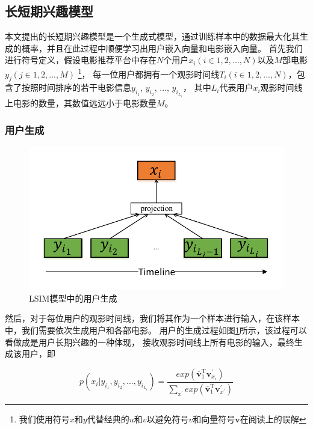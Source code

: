 \subsection{长短期兴趣模型}
本文提出的长短期兴趣模型是一个生成式模型，通过训练样本中的数据最大化其生成的概率，并且在此过程中顺便学习出用户嵌入向量和电影嵌入向量。
首先我们进行符号定义，假设电影推荐平台中存在$N$个用户$x_i(i \in 1,2,...,N)$以及$M$部电影$y_j(j \in 1,2,...,M)$
\footnote{我们使用符号$x$和$y$代替经典的$u$和$v$以避免符号$v$和向量符号$\mathbf{v}$在阅读上的误解}，
每一位用户都拥有一个观影时间线$T_i(i \in 1,2,...,N)$，包含了按照时间排序的若干电影信息$y_{i_1}$, $y_{i_2}$, ..., $y_{i_{L_i}}$，
其中$L_i$代表用户$x_i$观影时间线上电影的数量，其数值远远小于电影数量$M$。

\subsubsection{用户生成}
\begin{figure}[htbp]
    \centering
    \includegraphics[scale=0.6]{images/doc2vec1.pdf}
    \caption{LSIM模型中的用户生成}
    \label{fig:doc2vec1}
\end{figure}

然后，对于每位用户的观影时间线，我们将其作为一个样本进行输入，在该样本中，我们需要依次生成用户和各部电影。
用户的生成过程如图\ref{fig:doc2vec1}所示，该过程可以看做成是用户长期兴趣的一种体现，
接收观影时间线上所有电影的输入，最终生成该用户，即

\begin{equation}
p(x_i | y_{i_1}, y_{i_2}, ..., y_{i_{L_i}}) =
\frac
{
    exp ( \overline{\mathbf{v}}_{1}^{\mathrm{T}} \mathbf{v}_{x_i}^{'} )
}
{
    \sum_{x^{'}} exp ( \overline{\mathbf{v}}_{1}^{\mathrm{T}} \mathbf{v}_{x^{'}}^{'} )
}
\end{equation}

